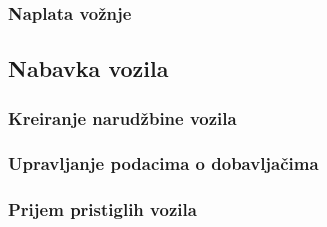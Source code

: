 \documentclass{article}
\begin{document}
\subsubsection{\bfseries Naplata vo\v znje}
\subsection{\bfseries Nabavka vozila}
\subsubsection{\bfseries Kreiranje narud\v zbine vozila}
\subsubsection{\bfseries Upravljanje podacima o dobavlja\v cima}
\subsubsection{\bfseries Prijem pristiglih vozila}
\end{document}
